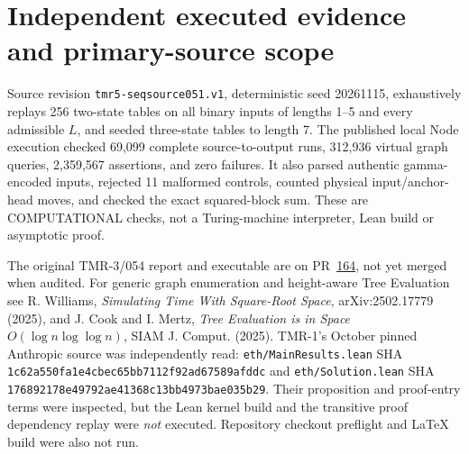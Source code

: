 \documentclass[11pt]{article}
\begin{document}
\section{Independent executed evidence and primary-source scope}
Source revision \texttt{tmr5-seqsource051.v1}, deterministic seed 20261115,
exhaustively replays 256 two-state tables on all binary inputs of lengths
1--5 and every admissible \(L\), and seeded three-state tables to length 7.
The published local Node execution checked 69,099 complete
source-to-output runs, 312,936 virtual graph queries,
2,359,567 assertions, and zero failures.
It also parsed authentic gamma-encoded inputs, rejected 11 malformed
controls, counted physical input/anchor-head moves, and checked the
exact squared-block sum. These are COMPUTATIONAL checks, not a
Turing-machine interpreter, Lean build or asymptotic proof.

The original TMR-3/054 report and executable are on
PR~\href{https://github.com/j15marti/pnp/pull/164}{164}, not yet
merged when audited. For generic graph enumeration and height-aware
Tree Evaluation see R. Williams,
\emph{Simulating Time With Square-Root Space}, arXiv:2502.17779
(2025), and J. Cook and I. Mertz,
\emph{Tree Evaluation is in Space \(O(\log n\log\log n)\)},
SIAM J. Comput. (2025).
TMR-1's October pinned Anthropic source was independently read:
\texttt{eth/MainResults.lean} SHA
\texttt{1c62a550fa1e4cbec65bb7112f92ad67589afddc}
and \texttt{eth/Solution.lean} SHA
\texttt{176892178e49792ae41368c13bb4973bae035b29}.
Their proposition and proof-entry terms were inspected, but the
Lean kernel build and the transitive proof dependency replay were
\emph{not} executed. Repository checkout preflight and LaTeX build
were also not run.
\end{document}
